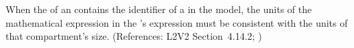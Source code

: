 When the   of an \EventAssignment
contains the identifier of a \Compartment in the model, the
units of the mathematical expression in the
\EventAssignment's  expression must be
consistent with the units of that compartment's size.
(References: L2V2 Section~4.14.2; )
